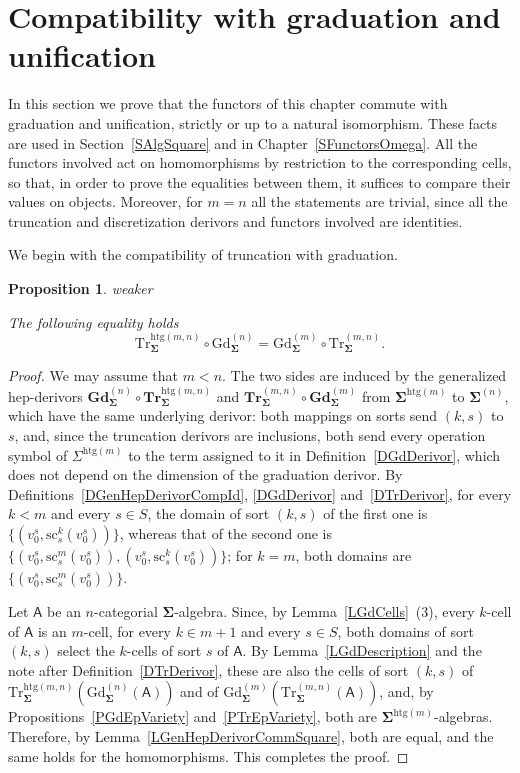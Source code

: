 \documentclass[a4paper, reqno]{amsbook}
\makeatletter
\newcommand{\sig}[1]{\mathbf{#1}}             %
\newcommand{\calg}[1]{\boldsymbol{\mathsf{#1}}} %
\newcommand{\htg}{\mathrm{htg}}                %
\newcommand{\src}{\mathrm{sc}}
\newcommand{\Gd}{\mathrm{Gd}}
\newcommand{\Tr}{\mathrm{Tr}}
\newcommand{\bGd}{\mathbf{Gd}}
\newcommand{\bTr}{\mathbf{Tr}}
\theoremstyle{plain}
\newtheorem{proposition}[theorem]{Proposition}
\theoremstyle{definition}
\newcommand*{\CA@leanpending}{}
\newcommand*{\CA@leanrelation}{}
\newcommand*{\lean}[2]{%
  \ifcsname\string\color@lean@#1\endcsname\else
    \PackageError{main}{Unknown relation `#1' in \string\lean}{Use equivalent, weaker or stronger.}%
  \fi
  \gdef\CA@leanrelation{#1}%
  \gdef\CA@leanpending{#2}}
\makeatother
\begin{document}
\section{Compatibility with graduation and unification}\label{SDsTrCompatGdUf}

In this section we prove that the functors of this chapter commute with graduation and unification, strictly or up to a natural isomorphism.
These facts are used in Section~\ref{SAlgSquare} and in Chapter~\ref{SFunctorsOmega}.
All the functors involved act on homomorphisms by restriction to the corresponding cells, so that, in order to prove the equalities between them, it suffices to compare their values on objects.
Moreover, for $m=n$ all the statements are trivial, since all the truncation and discretization derivors and functors involved are identities.

We begin with the compatibility of truncation with graduation.

\begin{proposition}\label{PCompatGdTr}\lean{weaker}{Dimensions.truncationGraduationFunctor}
The following equality holds
$$
\Tr^{\htg(m,n)}_{\sig{\Sigma}}\circ\Gd^{(n)}_{\sig{\Sigma}}=\Gd^{(m)}_{\sig{\Sigma}}\circ \Tr^{(m,n)}_{\sig{\Sigma}}.
$$
\end{proposition}
\begin{proof}
We may assume that $m<n$.
The two sides are induced by the generalized hep-derivors $\bGd^{(n)}_{\sig{\Sigma}}\circ\bTr^{\htg(m,n)}_{\sig{\Sigma}}$ and $\bTr^{(m,n)}_{\sig{\Sigma}}\circ\bGd^{(m)}_{\sig{\Sigma}}$ from $\sig{\Sigma}^{\htg(m)}$ to $\sig{\Sigma}^{(n)}$, which have the same underlying derivor: both mappings on sorts send $(k,s)$ to $s$, and, since the truncation derivors are inclusions, both send every operation symbol of $\Sigma^{\htg(m)}$ to the term assigned to it in Definition~\ref{DGdDerivor}, which does not depend on the dimension of the graduation derivor.
By Definitions~\ref{DGenHepDerivorCompId}, \ref{DGdDerivor} and~\ref{DTrDerivor}, for every $k<m$ and every $s\in S$, the domain of sort $(k,s)$ of the first one is $\{(v^s_0,\src^k_s(v^s_0))\}$, whereas that of the second one is $\{(v^s_0,\src^m_s(v^s_0)),(v^s_0,\src^k_s(v^s_0))\}$; for $k=m$, both domains are $\{(v^s_0,\src^m_s(v^s_0))\}$.

Let $\calg{A}$ be an $n$-categorial $\sig{\Sigma}$-algebra.
Since, by Lemma~\ref{LGdCells}~(3), every $k$-cell of $\calg{A}$ is an $m$-cell, for every $k\in m+1$ and every $s\in S$, both domains of sort $(k,s)$ select the $k$-cells of sort $s$ of $\calg{A}$.
By Lemma~\ref{LGdDescription} and the note after Definition~\ref{DTrDerivor}, these are also the cells of sort $(k,s)$ of $\Tr^{\htg(m,n)}_{\sig{\Sigma}}(\Gd^{(n)}_{\sig{\Sigma}}(\calg{A}))$ and of $\Gd^{(m)}_{\sig{\Sigma}}(\Tr^{(m,n)}_{\sig{\Sigma}}(\calg{A}))$, and, by Propositions~\ref{PGdEpVariety} and~\ref{PTrEpVariety}, both are $\sig{\Sigma}^{\htg(m)}$-algebras.
Therefore, by Lemma~\ref{LGenHepDerivorCommSquare}, both are equal, and the same holds for the homomorphisms. This completes the proof.
\end{proof}
\end{document}
